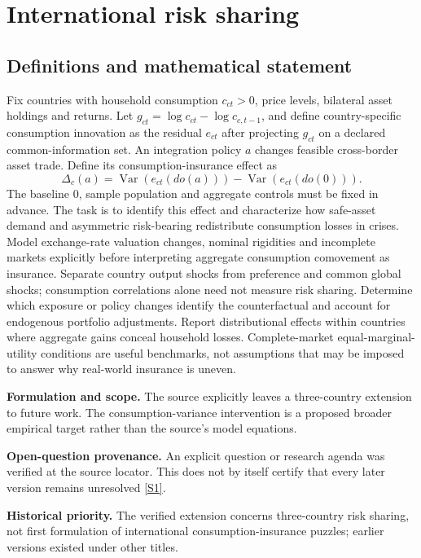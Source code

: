 \documentclass[11pt]{article}
\newcommand{\sref}[2]{\hyperlink{source:#1:#2}{[S#2]}}
\begin{document}
\section*{International risk sharing}\label{30007617}
\subsection{Definitions and mathematical statement}
Fix countries with household consumption \(c_{ct}>0\), price levels, bilateral asset holdings and returns. Let \(g_{ct}=\log c_{ct}-\log c_{c,t-1}\), and define country-specific consumption innovation as the residual \(e_{ct}\) after projecting \(g_{ct}\) on a declared common-information set. An integration policy \(a\) changes feasible cross-border asset trade. Define its consumption-insurance effect as
\[\Delta_c(a)=\operatorname{Var}(e_{ct}(do(a)))-\operatorname{Var}(e_{ct}(do(0))).\]
The baseline \(0\), sample population and aggregate controls must be fixed in advance. The task is to identify this effect and characterize how safe-asset demand and asymmetric risk-bearing redistribute consumption losses in crises. Model exchange-rate valuation changes, nominal rigidities and incomplete markets explicitly before interpreting aggregate consumption comovement as insurance. Separate country output shocks from preference and common global shocks; consumption correlations alone need not measure risk sharing. Determine which exposure or policy changes identify the counterfactual and account for endogenous portfolio adjustments. Report distributional effects within countries where aggregate gains conceal household losses. Complete-market equal-marginal-utility conditions are useful benchmarks, not assumptions that may be imposed to answer why real-world insurance is uneven.

\par\textbf{Formulation and scope.} The source explicitly leaves a three-country extension to future work. The consumption-variance intervention is a proposed broader empirical target rather than the source’s model equations.

\par\textbf{Open-question provenance.} An explicit question or research agenda was verified at the source locator. This does not by itself certify that every later version remains unresolved \sref{30007617}{1}.

\par\textbf{Historical priority.} The verified extension concerns three-country risk sharing, not first formulation of international consumption-insurance puzzles; earlier versions existed under other titles.
\end{document}
